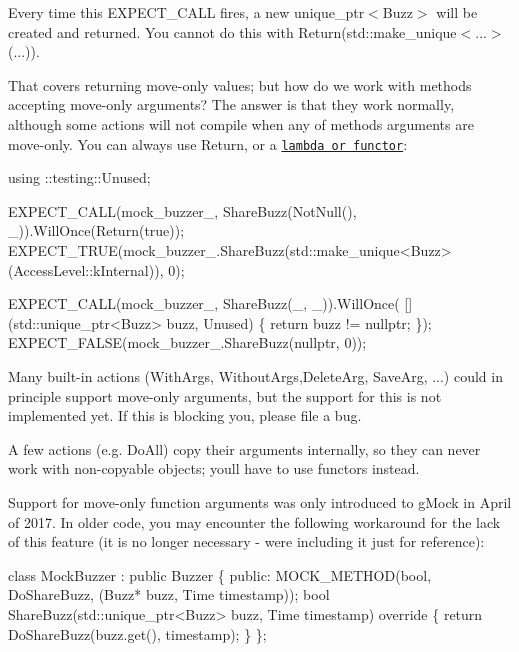 Every time this {\ttfamily E\+X\+P\+E\+C\+T\+\_\+\+C\+A\+LL} fires, a new {\ttfamily unique\+\_\+ptr$<$Buzz$>$} will be created and returned. You cannot do this with {\ttfamily Return(std\+::make\+\_\+unique$<$...$>$(...))}.

That covers returning move-\/only values; but how do we work with methods accepting move-\/only arguments? The answer is that they work normally, although some actions will not compile when any of method\textquotesingle{}s arguments are move-\/only. You can always use {\ttfamily Return}, or a \href{#FunctionsAsActions}{\tt lambda or functor}\+:


\begin{DoxyCode}
using ::testing::Unused;

EXPECT\_CALL(mock\_buzzer\_, ShareBuzz(NotNull(), \_)).WillOnce(Return(\textcolor{keyword}{true}));
EXPECT\_TRUE(mock\_buzzer\_.ShareBuzz(std::make\_unique<Buzz>(AccessLevel::kInternal)),
            0);

EXPECT\_CALL(mock\_buzzer\_, ShareBuzz(\_, \_)).WillOnce(
    [](std::unique\_ptr<Buzz> buzz, Unused) \{ \textcolor{keywordflow}{return} buzz != \textcolor{keyword}{nullptr}; \});
EXPECT\_FALSE(mock\_buzzer\_.ShareBuzz(\textcolor{keyword}{nullptr}, 0));
\end{DoxyCode}


Many built-\/in actions ({\ttfamily With\+Args}, {\ttfamily Without\+Args},{\ttfamily Delete\+Arg}, {\ttfamily Save\+Arg}, ...) could in principle support move-\/only arguments, but the support for this is not implemented yet. If this is blocking you, please file a bug.

A few actions (e.\+g. {\ttfamily Do\+All}) copy their arguments internally, so they can never work with non-\/copyable objects; you\textquotesingle{}ll have to use functors instead.

Support for move-\/only function arguments was only introduced to g\+Mock in April of 2017. In older code, you may encounter the following workaround for the lack of this feature (it is no longer necessary -\/ we\textquotesingle{}re including it just for reference)\+:


\begin{DoxyCode}
\textcolor{keyword}{class }MockBuzzer : \textcolor{keyword}{public} Buzzer \{
 \textcolor{keyword}{public}:
  MOCK\_METHOD(\textcolor{keywordtype}{bool}, DoShareBuzz, (Buzz* buzz, Time timestamp));
  \textcolor{keywordtype}{bool} ShareBuzz(std::unique\_ptr<Buzz> buzz, Time timestamp)\textcolor{keyword}{ override }\{
    \textcolor{keywordflow}{return} DoShareBuzz(buzz.get(), timestamp);
  \}
\};
\end{DoxyCode}


